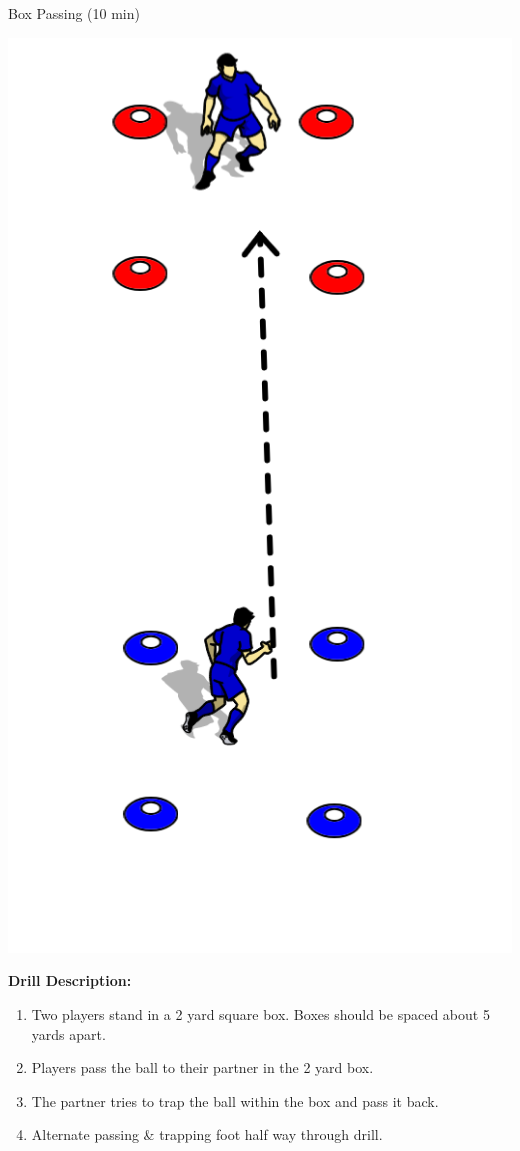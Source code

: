 \begin{oddBlock}{Box Passing (10 min)}

\begin{minipage}[t]{\linewidth}
    \centering
    
    \begin{minipage}{.3\linewidth} %
        \centering
        \includegraphics[width=.6\textwidth]{../img/Trimmed/Box_Passing_BW}
    \end{minipage}
    \hspace{0.05\linewidth}
    \begin{minipage}{.6\linewidth} %
        \textbf{Drill Description:}

        \begin{enumerate}
        \setlength{\itemsep}{0pt}
        \setlength{\parskip}{0pt}
        \setlength{\parsep}{0pt}
        \item Two players stand in a 2 yard square box.  Boxes should be spaced about 5 yards apart.
        \item Players pass the ball to their partner in the 2 yard box.
        \item The partner tries to trap the ball within the box and pass it back.
        \item Alternate passing \& trapping foot half way through drill.
        \end{enumerate}


\end{minipage}
\end{minipage}
\end{oddBlock}
